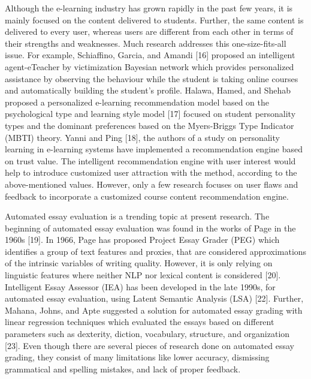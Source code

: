 \documentclass[conference]{IEEEtran}
\begin{document}
Although the e-learning industry has grown rapidly in the past few years, it is mainly focused on the content delivered to students. Further, the same content is delivered to every user, whereas users are different from each other in terms of their strengths and weaknesses. Much research addresses this one-size-fits-all issue. For example, Schiaffino, Garcia, and Amandi [16] proposed an intelligent agent-eTeacher by victimization Bayesian network which provides personalized assistance by observing the behaviour while the student is taking online courses and automatically building the student’s profile. Halawa, Hamed, and Shehab proposed a personalized e-learning recommendation model based on the psychological type and learning style model [17] focused on student personality types and the dominant preferences based on the Myers-Briggs Type Indicator (MBTI) theory. Yanni and Ping [18], the authors of a study on personality learning in e-learning systems have implemented a recommendation engine based on trust value. The intelligent recommendation engine with user interest would help to introduce customized user attraction with the method, according to the above-mentioned values. However, only a few research focuses on user flaws and feedback to incorporate a customized course content recommendation engine.

Automated essay evaluation is a trending topic at present research. The beginning of automated essay evaluation was found in the works of Page in the 1960s [19]. In 1966, Page has proposed Project Essay Grader (PEG) which identifies a group of text features and proxies, that are considered approximations of the intrinsic variables of writing quality. However, it is only relying on linguistic features where neither NLP nor lexical content is considered [20]. Intelligent Essay Assessor (IEA) has been developed in the late 1990s, for automated essay evaluation, using Latent Semantic Analysis (LSA) [22]. Further, Mahana, Johns, and Apte suggested a solution for automated essay grading with linear regression techniques which evaluated the essays based on different parameters such as dexterity, diction, vocabulary, structure, and organization [23]. Even though there are several pieces of research done on automated essay grading, they consist of many limitations like lower accuracy, dismissing grammatical and spelling mistakes, and lack of proper feedback.
\end{document}

